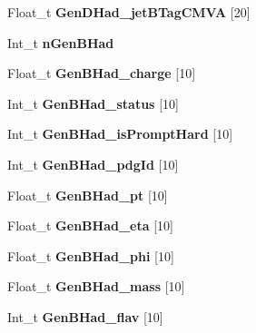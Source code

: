 \begin{DoxyCompactItemize}
\hypertarget{classMiniTree_a7ea0bf2a17e489529226c92621636327}{}\label{classMiniTree_a7ea0bf2a17e489529226c92621636327} 
Float\+\_\+t {\bfseries Gen\+D\+Had\+\_\+jet\+B\+Tag\+C\+M\+VA} \mbox{[}20\mbox{]}
\item 
\hypertarget{classMiniTree_a8a11442be8260a44e42c1829bb4f8bcd}{}\label{classMiniTree_a8a11442be8260a44e42c1829bb4f8bcd} 
Int\+\_\+t {\bfseries n\+Gen\+B\+Had}
\item 
\hypertarget{classMiniTree_a028e44d5ffebf33ea1536c4b85a2f4c8}{}\label{classMiniTree_a028e44d5ffebf33ea1536c4b85a2f4c8} 
Float\+\_\+t {\bfseries Gen\+B\+Had\+\_\+charge} \mbox{[}10\mbox{]}
\item 
\hypertarget{classMiniTree_a0940b103ad8863c83f34aa60cea67348}{}\label{classMiniTree_a0940b103ad8863c83f34aa60cea67348} 
Int\+\_\+t {\bfseries Gen\+B\+Had\+\_\+status} \mbox{[}10\mbox{]}
\item 
\hypertarget{classMiniTree_a060af67d09395efa4d5487b888ffb64b}{}\label{classMiniTree_a060af67d09395efa4d5487b888ffb64b} 
Int\+\_\+t {\bfseries Gen\+B\+Had\+\_\+is\+Prompt\+Hard} \mbox{[}10\mbox{]}
\item 
\hypertarget{classMiniTree_aafe738e27b91acd0ca8700254f938a1b}{}\label{classMiniTree_aafe738e27b91acd0ca8700254f938a1b} 
Int\+\_\+t {\bfseries Gen\+B\+Had\+\_\+pdg\+Id} \mbox{[}10\mbox{]}
\item 
\hypertarget{classMiniTree_a63b54c4d3850eb8bc468449d5f9b6933}{}\label{classMiniTree_a63b54c4d3850eb8bc468449d5f9b6933} 
Float\+\_\+t {\bfseries Gen\+B\+Had\+\_\+pt} \mbox{[}10\mbox{]}
\item 
\hypertarget{classMiniTree_a6579b0c04a7f631947bc63a338c7f1ed}{}\label{classMiniTree_a6579b0c04a7f631947bc63a338c7f1ed} 
Float\+\_\+t {\bfseries Gen\+B\+Had\+\_\+eta} \mbox{[}10\mbox{]}
\item 
\hypertarget{classMiniTree_a32afe6b24bfae4311e4760359fc73e12}{}\label{classMiniTree_a32afe6b24bfae4311e4760359fc73e12} 
Float\+\_\+t {\bfseries Gen\+B\+Had\+\_\+phi} \mbox{[}10\mbox{]}
\item 
\hypertarget{classMiniTree_a05084bc4d929654a62e75c6e9352d373}{}\label{classMiniTree_a05084bc4d929654a62e75c6e9352d373} 
Float\+\_\+t {\bfseries Gen\+B\+Had\+\_\+mass} \mbox{[}10\mbox{]}
\item 
\hypertarget{classMiniTree_ab2bed4adfcedcb15b25ae249844fe1df}{}\label{classMiniTree_ab2bed4adfcedcb15b25ae249844fe1df} 
Int\+\_\+t {\bfseries Gen\+B\+Had\+\_\+flav} \mbox{[}10\mbox{]}
\item 
\hypertarget{classMiniTree_a6c25b3a2c8acfae41691f2159183c398}{}\label{classMiniTree_a6c25b3a2c8acfae41691f2159183c398} 

\end{DoxyCompactItemize}
